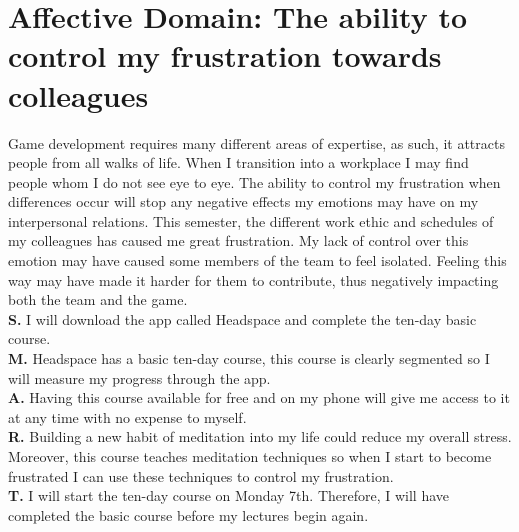 \documentclass{scrartcl}
\begin{document}
\section{Affective Domain: The ability to control my frustration towards colleagues}
Game development requires many different areas of expertise, as such, it attracts people from all walks of life. When I transition into a workplace I may find people whom I do not see eye to eye. The ability to control my frustration when differences occur will stop any negative effects my emotions may have on my interpersonal relations. This semester, the different work ethic and schedules of my colleagues has caused me great frustration. My lack of control over this emotion may have caused some members of the team to feel isolated. Feeling this way may have made it harder for them to contribute, thus negatively impacting both the team and the game. \\
\textbf{S.}    I will download the app called Headspace and complete the ten-day basic course.\\
\textbf{M.}   Headspace has a basic ten-day course, this course is clearly segmented so I will measure my progress through the app.\\
\textbf{A.}   Having this course available for free and on my phone will give me access to it at any time with no expense to myself. \\
\textbf{R.}  Building a new habit of meditation into my life could reduce my overall stress. Moreover, this course teaches meditation techniques so when I start to become frustrated I can use these techniques to control my frustration.\\
\textbf{T.}  I will start the ten-day course on Monday 7th. Therefore, I will have completed the basic course before my lectures begin again.\\
\end{document}

